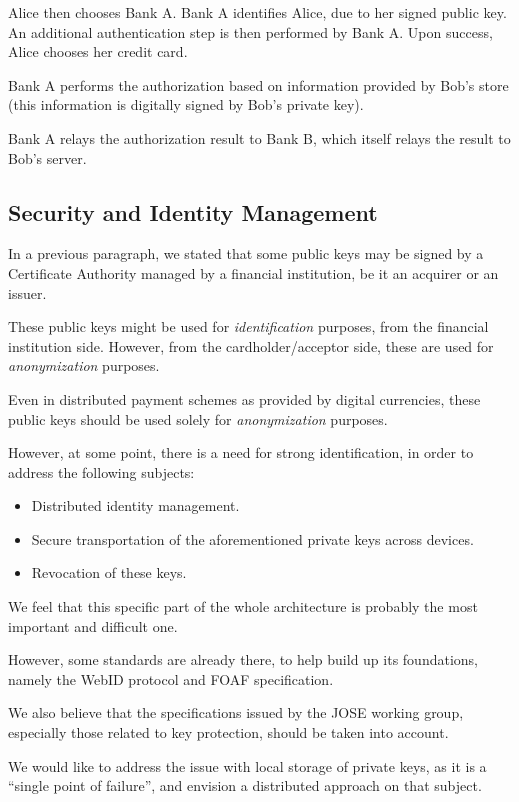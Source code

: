 Alice then chooses Bank A. Bank A identifies Alice, due to her signed
public key. An additional authentication step is then performed by Bank
A. Upon success, Alice chooses her credit card.

Bank A performs the authorization based on information provided by Bob's
store (this information is digitally signed by Bob's private key).

Bank A relays the authorization result to Bank B, which itself relays
the result to Bob's server.

\subsection{Security and Identity
Management}\label{security-and-identity-management}

In a previous paragraph, we stated that some public keys may be signed
by a Certificate Authority managed by a financial institution, be it an
acquirer or an issuer.

These public keys might be used for \emph{identification} purposes, from
the financial institution side. However, from the cardholder/acceptor
side, these are used for \emph{anonymization} purposes.

Even in distributed payment schemes as provided by digital currencies,
these public keys should be used solely for \emph{anonymization}
purposes.

However, at some point, there is a need for strong identification, in
order to address the following subjects:

\begin{itemize}
\item
  Distributed identity management.
\item
  Secure transportation of the aforementioned private keys across
  devices.
\item
  Revocation of these keys.
\end{itemize}

We feel that this specific part of the whole architecture is probably
the most important and difficult one.

However, some standards are already there, to help build up its
foundations, namely the WebID protocol and FOAF specification.

We also believe that the specifications issued by the JOSE working
group, especially those related to key protection, should be taken into
account.

We would like to address the issue with local storage of private keys,
as it is a ``single point of failure'', and envision a distributed
approach on that subject.

